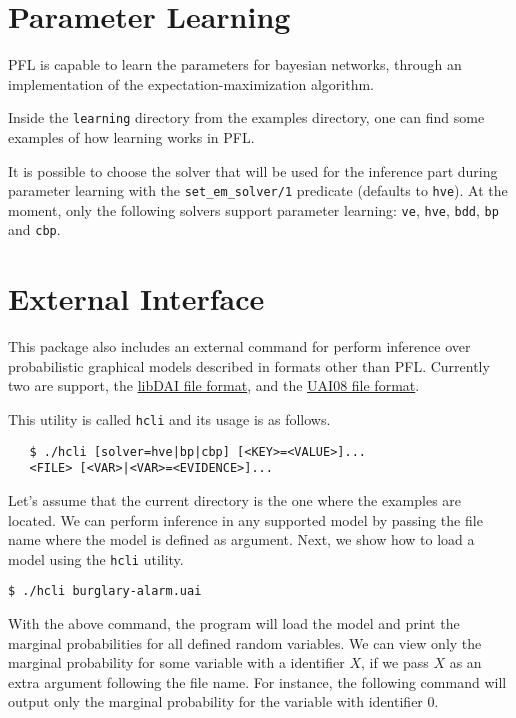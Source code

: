 \documentclass{article}
\begin{document}
\section{Parameter Learning}
PFL is capable to learn the parameters for bayesian networks, through an implementation of the expectation-maximization algorithm.

Inside the \texttt{learning} directory from the examples directory, one can find some examples of how learning works in PFL.

It is possible to choose the solver that will be used for the inference part during parameter learning with the \texttt{set\_em\_solver/1} predicate (defaults to \texttt{hve}). At the moment, only the following solvers support parameter learning: \texttt{ve}, \texttt{hve}, \texttt{bdd}, \texttt{bp} and \texttt{cbp}.




\section{External Interface}
This package also includes an external command for perform inference over probabilistic graphical models described in formats other than PFL. Currently two are support, the \href{http://cs.ru.nl/~jorism/libDAI/doc/fileformats.html}{libDAI file format}, and the \href{http://graphmod.ics.uci.edu/uai08/FileFormat}{UAI08 file format}.

This utility is called \texttt{hcli} and its usage is as follows.

\begin{verbatim}
   $ ./hcli [solver=hve|bp|cbp] [<KEY>=<VALUE>]...
   <FILE> [<VAR>|<VAR>=<EVIDENCE>]...
\end{verbatim}

Let's assume that the current directory is the one where the examples are located. We can perform inference in any supported model by passing the file name where the model is defined as argument. Next, we show how to load a model using the \texttt{hcli} utility.

\texttt{\$ ./hcli burglary-alarm.uai}

With the above command, the program will load the model and print the marginal probabilities for all defined random variables. We can view only the marginal probability for some variable with a identifier $X$, if we pass $X$ as an extra argument following the file name. For instance, the following command will output only the marginal probability for the variable with identifier $0$.
\end{document}
